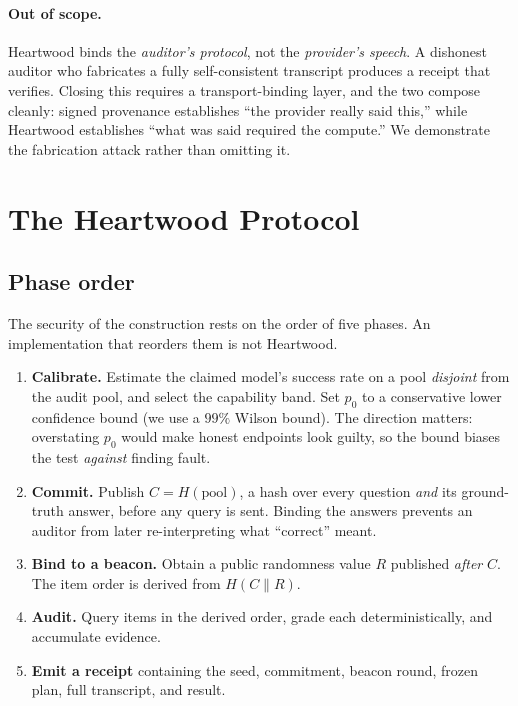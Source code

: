 \documentclass[11pt]{article}
\theoremstyle{definition}
\begin{document}
\paragraph{Out of scope.} Heartwood binds the \emph{auditor's protocol}, not the
\emph{provider's speech}. A dishonest auditor who fabricates a fully
self-consistent transcript produces a receipt that verifies. Closing this
requires a transport-binding layer, and the two compose cleanly: signed
provenance establishes ``the provider really said this,'' while Heartwood
establishes ``what was said required the compute.'' We demonstrate the
fabrication attack rather than omitting it.

\section{The Heartwood Protocol}

\subsection{Phase order}

The security of the construction rests on the order of five phases. An
implementation that reorders them is not Heartwood.

\begin{enumerate}
\item \textbf{Calibrate.} Estimate the claimed model's success rate on a pool
\emph{disjoint} from the audit pool, and select the capability band. Set $p_0$ to
a conservative lower confidence bound (we use a $99\%$ Wilson bound). The
direction matters: overstating $p_0$ would make honest endpoints look guilty, so
the bound biases the test \emph{against} finding fault.

\item \textbf{Commit.} Publish $C = H(\text{pool})$, a hash over every question
\emph{and} its ground-truth answer, before any query is sent. Binding the answers
prevents an auditor from later re-interpreting what ``correct'' meant.

\item \textbf{Bind to a beacon.} Obtain a public randomness value $R$ published
\emph{after} $C$. The item order is derived from $H(C \parallel R)$.

\item \textbf{Audit.} Query items in the derived order, grade each
deterministically, and accumulate evidence.

\item \textbf{Emit a receipt} containing the seed, commitment, beacon round,
frozen plan, full transcript, and result.
\end{enumerate}
\end{document}
